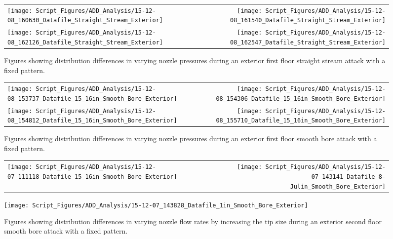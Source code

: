 \documentclass{article}
\begin{document}
\begin{figure}[ht]
\begin{tabular*}{\textwidth}{lr}
\texttt{[image: Script\_Figures/ADD\_Analysis/15-12-08\_160630\_Datafile\_Straight\_Stream\_Exterior]} &
\texttt{[image: Script\_Figures/ADD\_Analysis/15-12-08\_161540\_Datafile\_Straight\_Stream\_Exterior]} \\
\texttt{[image: Script\_Figures/ADD\_Analysis/15-12-08\_162126\_Datafile\_Straight\_Stream\_Exterior]} &
\texttt{[image: Script\_Figures/ADD\_Analysis/15-12-08\_162547\_Datafile\_Straight\_Stream\_Exterior]} \\
\end{tabular*}
\caption{Figures showing distribution differences in varying nozzle pressures during an exterior first floor straight stream attack with a fixed pattern.}
\label{fig:Exterior_First_Floor_Varying_Nozzle_Pressure_SS_Fixed_Pattern}
\end{figure}

\begin{figure}[ht]
\begin{tabular*}{\textwidth}{lr}
\texttt{[image: Script\_Figures/ADD\_Analysis/15-12-08\_153737\_Datafile\_15\_16in\_Smooth\_Bore\_Exterior]} &
\texttt{[image: Script\_Figures/ADD\_Analysis/15-12-08\_154306\_Datafile\_15\_16in\_Smooth\_Bore\_Exterior]} \\
\texttt{[image: Script\_Figures/ADD\_Analysis/15-12-08\_154812\_Datafile\_15\_16in\_Smooth\_Bore\_Exterior]} &
\texttt{[image: Script\_Figures/ADD\_Analysis/15-12-08\_155710\_Datafile\_15\_16in\_Smooth\_Bore\_Exterior]} \\
\end{tabular*}
\caption{Figures showing distribution differences in varying nozzle pressures during an exterior first floor smooth bore attack with a fixed pattern.}
\label{fig:Exterior_First_Floor_Varying_Nozzle_Pressure_SB_Fixed_Pattern}
\end{figure}

\begin{figure}[ht]
\begin{tabular*}{\textwidth}{lr}
\texttt{[image: Script\_Figures/ADD\_Analysis/15-12-07\_111118\_Datafile\_15\_16in\_Smooth\_Bore\_Exterior]} &
\texttt{[image: Script\_Figures/ADD\_Analysis/15-12-07\_143141\_Datafile\_8-Julin\_Smooth\_Bore\_Exterior]} \\
\end{tabular*}
\centering
\texttt{[image: Script\_Figures/ADD\_Analysis/15-12-07\_143828\_Datafile\_1in\_Smooth\_Bore\_Exterior]}
\caption{Figures showing distribution differences in varying nozzle flow rates by increasing the tip size during an exterior second floor smooth bore attack with a fixed pattern.}
\label{fig:Exterior_Second_Floor_Varying_Flow_Rates_SB_Fixed_Pattern}
\end{figure}
\end{document}
